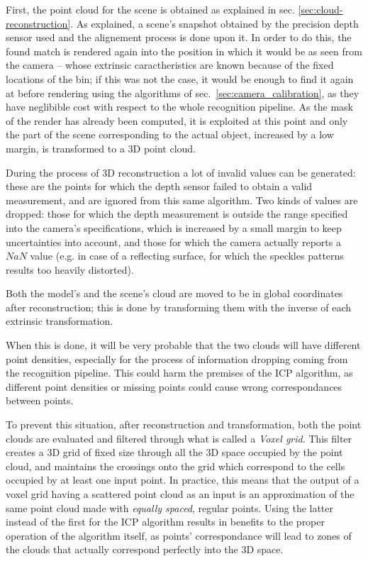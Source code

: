 First, the point cloud for the scene is obtained as explained in sec. \ref{sec:cloud-reconstruction}.
As explained, a scene's snapshot obtained by the precision depth
sensor used and the alignement process is done upon it. In order to
do this, the found match is rendered again into the position in which
it would be as seen from the camera -- whose extrinsic caractheristics
are known because of the fixed locations of the bin; if this was not
the case, it would be enough to find it again at before rendering
using the algorithms of sec.~\ref{sec:camera_calibration}, as they
have neglibible cost with respect to the whole recognition pipeline.
As the mask of the render has already been computed, it is exploited at this
point and only the part of the scene corresponding to the actual
object, increased by a low margin, is
transformed to a 3D point cloud.

During the process of 3D reconstruction a lot of invalid values can be
generated: these are the points for which the depth sensor failed to obtain a
valid measurement, and are ignored from this same algorithm. Two kinds
of values are dropped: those for which the depth measurement is
outside the range specified into the camera's specifications, which
is increased by a small margin to keep uncertainties into account, and
those for which the camera actually reports a $NaN$ value (e.g. in
case of a reflecting surface, for which the speckles patterns results
too heavily distorted).

Both the model's and the scene's cloud are moved to be in global
coordinates after reconstruction; this is done by transforming them
with the inverse of each extrinsic transformation.

When this is done, it will be very probable that the two clouds will
have different point densities, especially for the process of
information dropping coming from the recognition pipeline. This could
harm the premises of the ICP algorithm, as different point densities
or missing points could cause wrong correspondances between points.

To prevent this situation, after reconstruction and transformation,
both the point clouds are evaluated and filtered through what is
called a \emph{Voxel grid}. This filter creates a 3D grid of fixed
size through all the 3D space occupied by the point cloud, and
maintains the crossings onto the grid which correspond to the cells
occupied by at least one input point. In practice, this means that the
output of a voxel grid having a scattered point cloud as an input is
an approximation of the same point cloud made with \emph{equally
  spaced}, regular points. Using the latter instead of the first for
the ICP algorithm results in benefits to the proper
operation of the algorithm itself, as points' correspondance will
lead to zones of the clouds that actually correspond perfectly into the 3D space.


